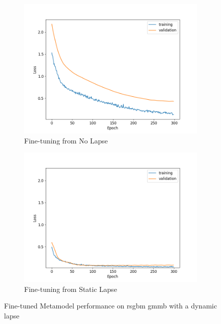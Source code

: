 \begin{figure}[ht!]
    \centering
    \begin{subfigure}{0.48\textwidth}
        \includegraphics[width=\textwidth]{./project3/figures/figure2a.png}
        \caption{Fine-tuning from No Lapse} 
        \label{subfig3-2:fromNolapse}
    \end{subfigure}\hfill
    \begin{subfigure}{0.48\textwidth}
        \includegraphics[width=\textwidth]{./project3/figures/figure2b.png}
        \caption{Fine-tuning from Static Lapse}
        \label{subfig3-2:fromLapse}
    \end{subfigure}
    \caption{Fine-tuned Metamodel performance on \gls{rsgbm} \gls{gmmb} with a dynamic lapse}
    \label{fig3:figure2}
\end{figure}

